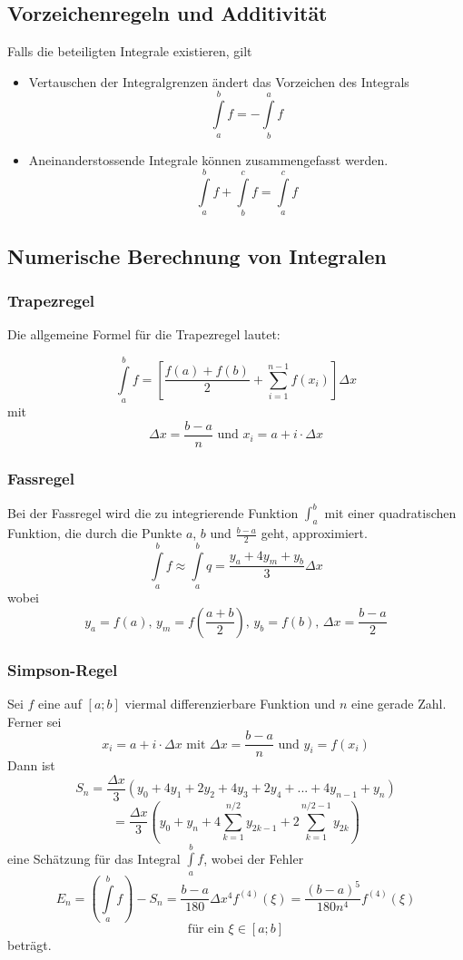 \documentclass[10pt,a4paper]{scrartcl}
\begin{document}
\subsection{Vorzeichenregeln und Additivität}

Falls die beteiligten Integrale existieren, gilt
\begin{itemize}
    \item Vertauschen der Integralgrenzen ändert das Vorzeichen des Integrals
    $$\int\limits_a^b f = - \int\limits_b^a f$$
    \item Aneinanderstossende Integrale können zusammengefasst werden.
    $$\int\limits_a^b f + \int\limits_b^c f = \int\limits_a^c f$$
\end{itemize}


\subsection{Numerische Berechnung von Integralen}


\subsubsection{Trapezregel}

Die allgemeine Formel für die Trapezregel lautet:

$$\int\limits_a^b f = \left[\frac{f(a) + f(b)}{2} + \sum_{i=1}^{n-1}
    f(x_i)\right] \Delta x$$
mit
$$\Delta x = \frac{b-a}{n} \textrm{ und } x_i = a + i \cdot \Delta x$$


\subsubsection{Fassregel}

Bei der Fassregel wird die zu integrierende Funktion $\int_a^b$ mit einer
quadratischen Funktion, die durch die Punkte $a$, $b$ und $\frac{b-a}{2}$ geht,
approximiert.
$$\int\limits_a^b f \approx \int\limits_a^b q = \frac{y_a + 4y_m
    + y_b}{3} \Delta x$$
wobei
$$y_a = f(a) \textrm{, } y_m = f\left(\frac{a+b}{2}\right) \textrm{, } y_b
    = f(b) \textrm{, } \Delta x = \frac{b-a}{2}$$


\subsubsection{Simpson-Regel}

Sei $f$ eine auf $[a;b]$ viermal differenzierbare Funktion und $n$ eine gerade
Zahl. Ferner sei
$$x_i = a + i \cdot \Delta x \textrm{ mit } \Delta x = \frac{b-a}{n}
    \textrm{ und } y_i = f(x_i)$$
Dann ist
$$S_n = \frac{\Delta x}{3}(y_0 + 4y_1 + 2y_2 + 4y_3 + 2y_4 + ... + 4y_{n-1}
    + y_n)$$
$$= \frac{\Delta x}{3}\left(y_0 + y_n + 4 \sum_{k=1}^{n/2} y_{2k-1} + 2
    \sum_{k=1}^{n/2-1} y_{2k}\right)$$
eine Schätzung für das Integral $\int\limits_a^b f$, wobei der Fehler
$$E_n = \left(\int\limits_a^b f\right) - S_n = \frac{b-a}{180}\Delta x^4
    f^{(4)}(\xi) = \frac{(b-a)^5}{180n^4} f^{(4)}(\xi)$$
$$\textrm{für ein } \xi \in [a;b]$$
beträgt.
\end{document}

